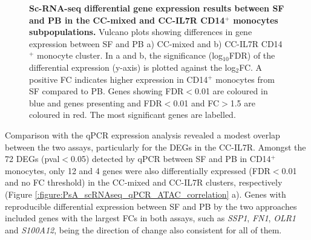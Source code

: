 \begin{figure}[H]
\begin{subfigure}[b]{0.55\textwidth}
\caption{}
\end{subfigure}
\caption[Sc-RNA-seq differential gene expression results between SF and PB in the CC-mixed and CC-IL7R CD14$^+$ monocytes subpopulations.]{\textbf{Sc-RNA-seq differential gene expression results between SF and PB in the CC-mixed and CC-IL7R CD14$^+$ monocytes subpopulations.} Vulcano plots showing differences in gene expression between SF and PB a) CC-mixed and b) CC-IL7R CD14$^+$ monocyte cluster. In a and b, the significance (log${_10}$FDR) of the differential expression (y-axis) is plotted against the log${_2}$FC. A positive FC indicates higher expression in CD14$^+$ monocytes from SF compared to PB. Genes showing FDR$<$0.01 are coloured in blue and genes presenting and FDR$<$0.01 and FC$>$1.5 are coloured in red. The most significant genes are labelled.}
\label{figure:PsA_scRNAseq_vulcano_plots_mixed_and_IL7R_clusters}
\end{figure}



Comparison with the qPCR expression analysis revealed a modest overlap between the two assays, particularly for the DEGs in the CC-IL7R. Amongst the 72 DEGs (pval$<$0.05) detected by qPCR between SF and PB in CD14$^+$ monocytes, only 12 and 4 genes were also differentially expressed (FDR$<$0.01 and no FC threshold) in the CC-mixed and CC-IL7R clusters, respectively (Figure \ref{:figure:PsA_scRNAseq_qPCR_ATAC_correlation} a). Genes with reproducible differential expression between SF and PB by the two approaches included genes with the largest FCs in both assays, such as \textit{SSP1}, \textit{FN1}, \textit{OLR1} and \textit{S100A12}, being the direction of change also consistent for all of them. %
   
